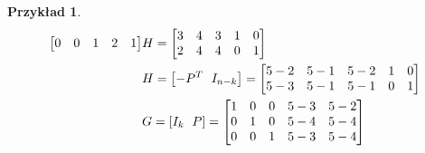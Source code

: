 \documentclass[a4paper,12pt]{article}
\theoremstyle{definition}%
\newtheorem{example}{Przykład}
\newtheorem*{example*}{Przykład} %
\theoremstyle{definition}
\theoremstyle{problem}
\begin{document}
\begin{example*}
\begin{align*}
\begin{bmatrix}
0&0&1&2&1
\end{bmatrix} & H=\begin{bmatrix}
3&4&3&1&0\\
2&4&4&0&1
\end{bmatrix}\\
&H=\left[{\huge -P^T\ I_{n-k}}\right]=\begin{bmatrix}
5-2 & 5-1 & 5-2 & 1 & 0\\
5-3 & 5-1 & 5-1 & 0 & 1
\end{bmatrix}\\
&G=\left[{\huge I_k\ P}\right]=\begin{bmatrix}
1 & 0 & 0 & 5-3 & 5-2\\
0 & 1 & 0 & 5-4 & 5-4\\
0 & 0 & 1 & 5-3 & 5-4
\end{bmatrix}
\end{align*}
\end{example*}
\end{document}

